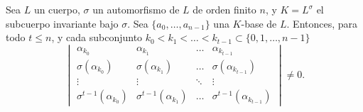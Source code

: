 \begin{lemma}
\label{lem:det_0}
    Sea \(L\) un cuerpo, \(\sigma\) un automorfismo de \(L\) de orden finito \(n\), y \(K = L^\sigma\) el subcuerpo invariante bajo \(\sigma\). Sea  \(\{a_0, \dots, a_{n-1}\}\) una \(K\)-base de \(L\). Entonces, para todo \(t \leq n\), y cada subconjunto \(k_0 < k_1 < \dots < k_{t-1} \subset \{0, 1, \dots, n-1\}\)
    \[
    \begin{vmatrix}
        \alpha_{k_0} & \alpha_{k_1} & \dots & \alpha_{k_{t -1}} \\
        \sigma(\alpha_{k_0}) & \sigma(\alpha_{k_1}) & \dots & \sigma(\alpha_{k_{t-1}}) \\
        \vdots & \vdots & \ddots & \vdots \\
        \sigma^{t-1}(\alpha_{k_0}) & \sigma^{t-1}(\alpha_{k_1}) & \dots & \sigma^{t-1}(\alpha_{k_{t-1}})
    \end{vmatrix}
    \neq 0
    .\]
\end{lemma}

